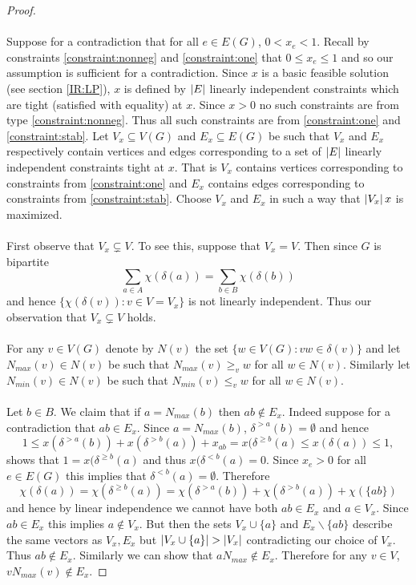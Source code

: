 \begin{proof}
\paragraph{}
Suppose for a contradiction that for all $e \in E(G)$, $0 <x_e < 1$. Recall by constraints \ref{constraint:nonneg} and \ref{constraint:one} that $0 \leq x_e \leq 1$ and so our assumption is sufficient for a contradiction. Since $x$ is a basic feasible solution (see section \ref{IR:LP}), $x$ is defined by $\left|E\right|$ linearly independent constraints which are tight (satisfied with equality) at $x$. Since $x > 0$ no such constraints are from type \ref{constraint:nonneg}. Thus all such constraints are from \ref{constraint:one} and \ref{constraint:stab}. Let $V_x \subseteq V(G)$ and $E_x \subseteq E(G)$ be such that $V_x$ and $E_x$ respectively contain vertices and edges corresponding to a set of $\left|E\right|$ linearly independent constraints tight at $x$. That is $V_x$ contains vertices corresponding to constraints from \ref{constraint:one} and $E_x$ contains edges corresponding to constraints from \ref{constraint:stab}. Choose $V_x$ and $E_x$ in such a way that $\left|V_x\right|x$ is maximized.
\paragraph{}
First observe that $V_x \subsetneq V$. To see this, suppose that $V_x = V$. Then since $G$ is bipartite
$$\sum_{a \in A} \chi(\delta(a)) = \sum_{b \in B} \chi(\delta(b))$$
and hence $\{\chi(\delta(v)) : v \in V=V_x\}$ is not linearly independent. Thus our observation that $V_x \subsetneq V$ holds.
\paragraph{}
For any $v \in V(G)$ denote by $N(v)$ the set $\{ w \in V(G): vw \in \delta(v)\}$ and let $N_{max}(v) \in N(v)$ be such that $N_{max}(v) \geq_v w$ for all $w \in N(v)$. Similarly let $N_{min}(v) \in N(v)$ be such that $N_{min}(v) \leq_v w$ for all $w \in N(v)$.
\paragraph{}
Let $b \in B$. We claim that if $a = N_{max}(b)$ then $ab \not\in E_x$. Indeed suppose for a contradiction that $ab \in E_x$. Since $a = N_{max}(b)$, $\delta^{>a}(b) = \emptyset$ and hence
$$1 \leq x(\delta^{>a}(b)) + x(\delta^{>b}(a)) + x_{ab}  = x(\delta^{\geq b}(a) \leq x(\delta(a)) \leq 1,$$
shows that $1 = x(\delta^{\geq b}(a)$ and thus $x(\delta^{<b}(a) = 0$. Since $x_e > 0$ for all $e \in E(G)$ this implies that $\delta^{<b}(a) = \emptyset$. Therefore
$$\chi(\delta(a)) = \chi(\delta^{\geq b}(a)) = \chi(\delta^{>a}(b)) + \chi(\delta^{>b}(a)) + \chi(\{ab\})$$
and hence by linear independence we cannot have both $ab \in E_x$ and $a \in V_x$. Since $ab \in E_x$ this implies $a \not\in V_x$. But then the sets $V_x \cup\{a\}$ and $E_x \backslash\{ab\}$ describe the same vectors as $V_x, E_x$ but $\left|V_x \cup\{a\}\right| > \left|V_x\right|$ contradicting our choice of $V_x$. Thus $ab \not\in E_x$. Similarly we can show that $aN_{max} \not\in E_x$. Therefore for any $v \in V$, $vN_{max}(v) \not\in E_x$.

\end{proof}
